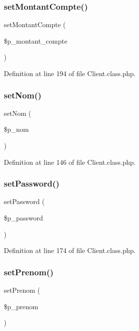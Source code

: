 \subsubsection{\texorpdfstring{set\+Montant\+Compte()}{setMontantCompte()}}
{\footnotesize\ttfamily set\+Montant\+Compte (\begin{DoxyParamCaption}\item[{}]{\$p\+\_\+montant\+\_\+compte }\end{DoxyParamCaption})}



Definition at line 194 of file Client.\+class.\+php.

\mbox{\label{class_client_a64e05abe01ecd950dda832ceb8ad95a9}} 
\subsubsection{\texorpdfstring{set\+Nom()}{setNom()}}
{\footnotesize\ttfamily set\+Nom (\begin{DoxyParamCaption}\item[{}]{\$p\+\_\+nom }\end{DoxyParamCaption})}



Definition at line 146 of file Client.\+class.\+php.

\mbox{\label{class_client_aef4f2967c7fc72f354139c124fbe55f6}} 
\subsubsection{\texorpdfstring{set\+Password()}{setPassword()}}
{\footnotesize\ttfamily set\+Password (\begin{DoxyParamCaption}\item[{}]{\$p\+\_\+password }\end{DoxyParamCaption})}



Definition at line 174 of file Client.\+class.\+php.

\mbox{\label{class_client_a7bf9e7d18fd0cf6e38ffba353a5ad180}} 
\subsubsection{\texorpdfstring{set\+Prenom()}{setPrenom()}}
{\footnotesize\ttfamily set\+Prenom (\begin{DoxyParamCaption}\item[{}]{\$p\+\_\+prenom }\end{DoxyParamCaption})}



